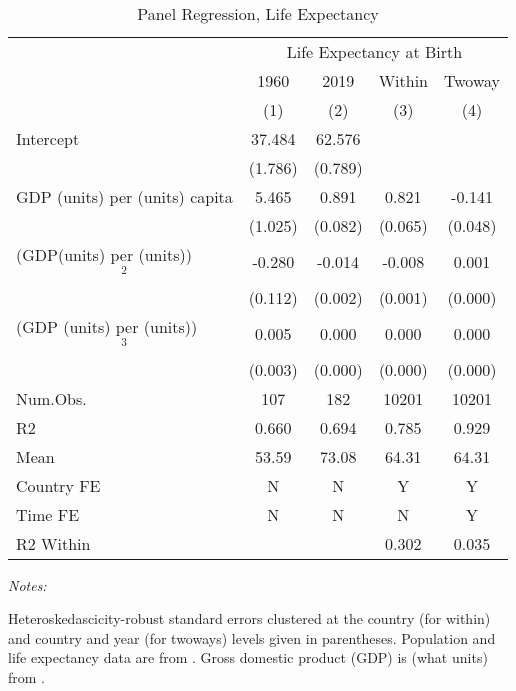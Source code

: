 \begin{table}[H]

\caption{Panel Regression, Life Expectancy \label{tab:hw03regpanel}}
\centering
\begin{threeparttable}
\begin{tabular}[t]{lcccc}
\toprule
\multicolumn{1}{c}{ } & \multicolumn{4}{c}{Life Expectancy at Birth} \\
\cmidrule(l{3pt}r{3pt}){2-5}
\multicolumn{1}{c}{ } & \multicolumn{1}{c}{1960} & \multicolumn{1}{c}{2019} & \multicolumn{1}{c}{Within} & \multicolumn{1}{c}{Twoway} \\
\cmidrule(l{3pt}r{3pt}){2-2} \cmidrule(l{3pt}r{3pt}){3-3} \cmidrule(l{3pt}r{3pt}){4-4} \cmidrule(l{3pt}r{3pt}){5-5}
  & (1) & (2) & (3) & (4)\\
\midrule
Intercept & 37.484 & 62.576 &  & \\
 & (1.786) & (0.789) &  & \\
GDP (units) per (units) capita & 5.465 & 0.891 & 0.821 & -0.141\\
 & (1.025) & (0.082) & (0.065) & (0.048)\\
(GDP(units) per (units))$$^2$$ & -0.280 & -0.014 & -0.008 & 0.001\\
 & (0.112) & (0.002) & (0.001) & (0.000)\\
(GDP (units) per (units))$$^3$$ & 0.005 & 0.000 & 0.000 & 0.000\\
 & (0.003) & (0.000) & (0.000) & (0.000)\\
\midrule
Num.Obs. & 107 & 182 & 10201 & 10201\\
R2 & 0.660 & 0.694 & 0.785 & 0.929\\
Mean & 53.59 & 73.08 & 64.31 & 64.31\\
Country FE & N & N & Y & Y\\
Time FE & N & N & N & Y\\
R2 Within &  &  & 0.302 & 0.035\\
\bottomrule
\end{tabular}
\begin{tablenotes}
\item \textit{Notes: } 
\item Heteroskedascicity-robust standard errors clustered at the country (for within) and country and year (for twoways) levels given in parentheses. Population and life expectancy data are from \citet{undesaWorldPopulationProspects2022}. Gross domestic product (GDP) is (what units) from \citet{feenstraNextGenerationPenn2015}.
\end{tablenotes}
\end{threeparttable}
\end{table}
